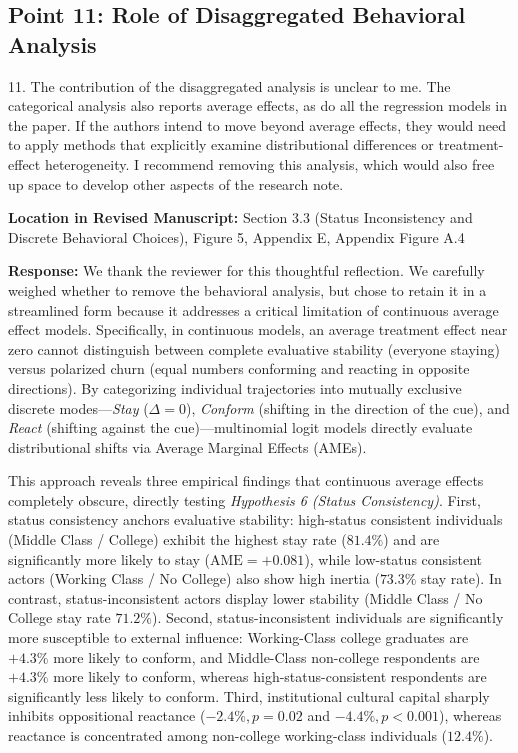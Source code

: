 \documentclass[11pt, letterpaper]{article}
\begin{document}
\vspace{10pt}

\subsection*{Point 11: Role of Disaggregated Behavioral Analysis}

\begin{reviewercomment}
11. The contribution of the disaggregated analysis is unclear to me. The categorical analysis also reports average effects, as do all the regression models in the paper. If the authors intend to move beyond average effects, they would need to apply methods that explicitly examine distributional differences or treatment-effect heterogeneity. I recommend removing this analysis, which would also free up space to develop other aspects of the research note.
\end{reviewercomment}

\textbf{Location in Revised Manuscript:} Section 3.3 (Status Inconsistency and Discrete Behavioral Choices), Figure 5, Appendix E, Appendix Figure A.4

\textbf{Response:}
We thank the reviewer for this thoughtful reflection. We carefully weighed whether to remove the behavioral analysis, but chose to retain it in a streamlined form because it addresses a critical limitation of continuous average effect models. Specifically, in continuous models, an average treatment effect near zero cannot distinguish between complete evaluative stability (everyone staying) versus polarized churn (equal numbers conforming and reacting in opposite directions). By categorizing individual trajectories into mutually exclusive discrete modes---\textit{Stay} ($\Delta = 0$), \textit{Conform} (shifting in the direction of the cue), and \textit{React} (shifting against the cue)---multinomial logit models directly evaluate distributional shifts via Average Marginal Effects (AMEs).

This approach reveals three empirical findings that continuous average effects completely obscure, directly testing \textit{Hypothesis 6 (Status Consistency)}. First, status consistency anchors evaluative stability: high-status consistent individuals (Middle Class / College) exhibit the highest stay rate ($81.4\%$) and are significantly more likely to stay ($\text{AME} = +0.081$), while low-status consistent actors (Working Class / No College) also show high inertia ($73.3\%$ stay rate). In contrast, status-inconsistent actors display lower stability (Middle Class / No College stay rate $71.2\%$). Second, status-inconsistent individuals are significantly more susceptible to external influence: Working-Class college graduates are $+4.3\%$ more likely to conform, and Middle-Class non-college respondents are $+4.3\%$ more likely to conform, whereas high-status-consistent respondents are significantly less likely to conform. Third, institutional cultural capital sharply inhibits oppositional reactance ($-2.4\%, p = 0.02$ and $-4.4\%, p < 0.001$), whereas reactance is concentrated among non-college working-class individuals ($12.4\%$).
\end{document}
